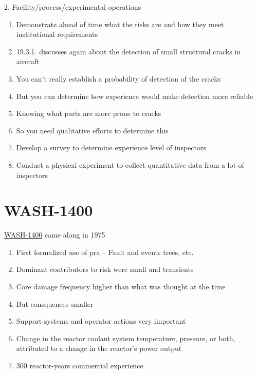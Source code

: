 \documentclass[aspectratio=1610,pdftex,dvipsnames,compress,xcolor={dvipsnames}]{beamer}
\newcommand{\acs}{\acrshort} %
\newcommand{\acsp}{\acrshortpl} %
\begin{document}
\begin{frame}{2. Facility/process/experimental operations}
    \begin{enumerate}[series=outerlist,topsep=0pt,itemsep=11pt,leftmargin=*,label=(\arabic*)]
        \item[]Demonstrate ahead of time what the risks are and how they meet institutional requirements
        \item[]19.3.1. discusses again about the detection of small structural cracks in aircraft
        \item[]You can't really establish a probability of detection of the cracks
        \item[]But you can determine how experience would make detection more reliable
        \item[]Knowing what parts are more prone to cracks
        \item[]So you need qualitative efforts to determine this
        \item[]Develop a survey to determine experience level of inspectors
        \item[]Conduct a physical experiment to collect quantitative data from a lot of inspectors
    \end{enumerate}
\end{frame}


\section{WASH-1400}


\addtocounter{framenumber}{-1}
\begin{frame}{\href{https://uidaho.pressbooks.pub/riskassessment/chapter/pra-2/}{WASH-1400} came along in 1975}
    \begin{enumerate}[series=outerlist,topsep=0pt,itemsep=11pt,leftmargin=*,label=(\arabic*)]
        \item[]First formalized use of \acs{pra} -- Fault and events trees, etc.
        \item[]Dominant contributors to risk were small \acsp{loc} and transients
        \item[]Core damage frequency higher than what was thought at the time  
        \item[]But consquences smaller
        \item[]Support systems and operator actions very important
        \item[]Change in the reactor coolant system temperature, pressure, or both, attributed to a change in the reactor's power output
        \item[]300 reactor-years commercial experience
    \end{enumerate}
\end{frame}
\end{document}
